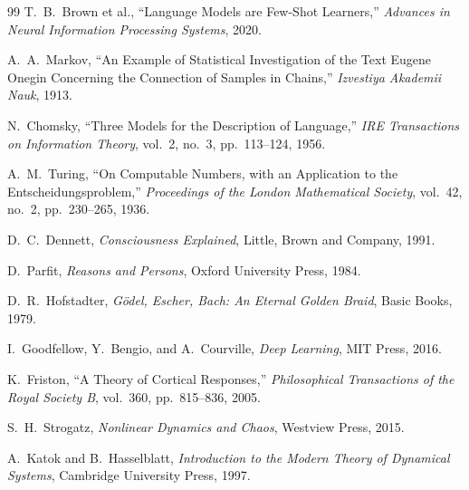 \documentclass[12pt, a4paper]{article}
\theoremstyle{plain}
\theoremstyle{definition}
\theoremstyle{remark}
\begin{document}
\begin{thebibliography}{99}
T.~B.~Brown et al.,
``Language Models are Few-Shot Learners,''
\emph{Advances in Neural Information Processing Systems}, 2020.

A.~A.~Markov,
``An Example of Statistical Investigation of the Text Eugene Onegin Concerning the Connection of Samples in Chains,''
\emph{Izvestiya Akademii Nauk}, 1913.

N.~Chomsky,
``Three Models for the Description of Language,''
\emph{IRE Transactions on Information Theory}, vol.~2, no.~3, pp.~113--124, 1956.

A.~M.~Turing,
``On Computable Numbers, with an Application to the Entscheidungsproblem,''
\emph{Proceedings of the London Mathematical Society}, vol.~42, no.~2, pp.~230--265, 1936.

D.~C.~Dennett,
\emph{Consciousness Explained},
Little, Brown and Company, 1991.

D.~Parfit,
\emph{Reasons and Persons},
Oxford University Press, 1984.

D.~R.~Hofstadter,
\emph{G\"{o}del, Escher, Bach: An Eternal Golden Braid},
Basic Books, 1979.

I.~Goodfellow, Y.~Bengio, and A.~Courville,
\emph{Deep Learning},
MIT Press, 2016.

K.~Friston,
``A Theory of Cortical Responses,''
\emph{Philosophical Transactions of the Royal Society B}, vol.~360, pp.~815--836, 2005.

S.~H.~Strogatz,
\emph{Nonlinear Dynamics and Chaos},
Westview Press, 2015.

A.~Katok and B.~Hasselblatt,
\emph{Introduction to the Modern Theory of Dynamical Systems},
Cambridge University Press, 1997.

\end{thebibliography}
\end{document}
